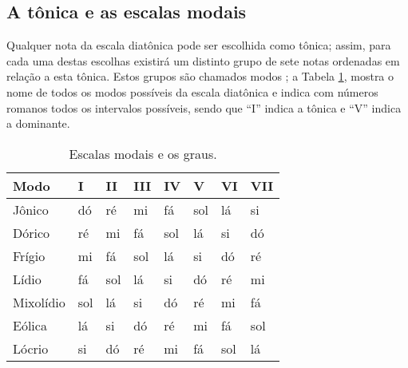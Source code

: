 \subsection{A tônica e as escalas modais}
Qualquer nota da escala diatônica pode ser escolhida como tônica;
assim, para cada uma destas escolhas existirá um distinto grupo de sete notas
ordenadas em relação a esta tônica. Estos grupos são chamados modos \cite[pp. 21]{holst1998abc};
a Tabela \ref{tab:modosdiatonica}, mostra o nome de todos os modos possíveis da escala diatônica
e indica com números romanos todos os intervalos possíveis,
sendo que ``I'' indica a tônica e ``V'' indica a dominante.

\begin{table}[h]
  \centering
  \begin{tabular}{|l||l|l|l|l|l|l|l|}
  \hline
  Modo      & I   & II  & III & IV  & V   & VI  & VII \\ \hline \hline
  Jônico    & dó  & ré  & mi  & fá  & sol & lá  & si  \\ \hline
  Dórico    & ré  & mi  & fá  & sol & lá  & si  & dó  \\ \hline
  Frígio    & mi  & fá  & sol & lá  & si  & dó  & ré  \\ \hline
  Lídio     & fá  & sol & lá  & si  & dó  & ré  & mi  \\ \hline
  Mixolídio & sol & lá  & si  & dó  & ré  & mi  & fá  \\ \hline
  Eólica    & lá  & si  & dó  & ré  & mi  & fá  & sol \\ \hline
  Lócrio    & si  & dó  & ré  & mi  & fá  & sol & lá  \\ \hline
  \end{tabular}
  \caption{Escalas modais e os graus.}
  \label{tab:modosdiatonica}
\end{table}

